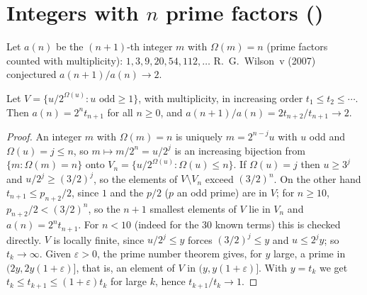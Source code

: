 \section{Integers with \texorpdfstring{$n$}{n} prime factors ()}\label{s:A078841}
Let $a(n)$ be the $(n+1)$-th integer $m$ with $\Omega(m)=n$ (prime factors counted with multiplicity):
$1,3,9,20,54,112,\dots$ R.~G.~Wilson~v (2007) conjectured $a(n+1)/a(n)\to2$.
\begin{theorem} Let $V=\{u/2^{\Omega(u)}:u\text{ odd}\ge1\}$, with multiplicity, in increasing order
$t_1\le t_2\le\cdots$. Then $a(n)=2^nt_{n+1}$ for all $n\ge0$, and $a(n+1)/a(n)=2t_{n+2}/t_{n+1}\to2$.\end{theorem}
\begin{proof} An integer $m$ with $\Omega(m)=n$ is uniquely $m=2^{n-j}u$ with $u$ odd and $\Omega(u)=j\le n$, so
$m\mapsto m/2^n=u/2^j$ is an increasing bijection from $\{m:\Omega(m)=n\}$ onto $V_n=\{u/2^{\Omega(u)}:\Omega(u)\le n\}$.
If $\Omega(u)=j$ then $u\ge3^j$ and $u/2^j\ge(3/2)^j$, so the elements of $V\setminus V_n$ exceed $(3/2)^n$. On the
other hand $t_{n+1}\le p_{n+2}/2$, since $1$ and the $p/2$ ($p$ an odd prime) are in $V$; for $n\ge10$,
$p_{n+2}/2<(3/2)^n$, so the $n+1$ smallest elements of $V$ lie in $V_n$ and $a(n)=2^nt_{n+1}$. For $n<10$ (indeed
for the 30 known terms) this is checked directly. $V$ is locally finite, since $u/2^j\le y$ forces
$(3/2)^j\le y$ and $u\le2^jy$; so $t_k\to\infty$. Given $\varepsilon>0$, the prime number theorem gives, for $y$
large, a prime in $(2y,2y(1+\varepsilon)]$, that is, an element of $V$ in $(y,y(1+\varepsilon)]$. With $y=t_k$ we get
$t_k\le t_{k+1}\le(1+\varepsilon)t_k$ for large $k$, hence $t_{k+1}/t_k\to1$. \end{proof}

